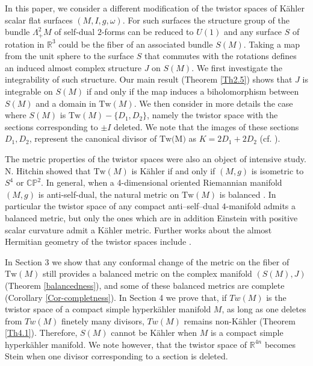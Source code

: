 \documentclass[11pt]{amsart}
\theoremstyle{definition}
\theoremstyle{plain}
\theoremstyle{definition}
\theoremstyle{plain}
\theoremstyle{remark}
\theoremstyle{plain}
\begin{document}
In this paper, we consider a different modification of the twistor spaces of K\"ahler scalar flat surfaces $(M, I, g, \omega)$. For such surfaces the structure group of the bundle $\Lambda^2_+ M$ of self-dual $2$-forms  can be reduced to $U(1)$ and any surface $S$ of rotation in ${\mathbb R}^3$ could be the fiber of an associated bundle $S(M)$. Taking a map from the unit sphere to  the surface $S$ that  commutes with the rotations  defines an induced almost complex structure $J$ on $S(M)$. We first investigate the integrability of such structure. Our main result (Theorem \ref{Th2.5})  shows that  $J$   is integrable on $S(M)$ if and only if the map induces a biholomorphism between $S(M)$ and a domain in ${\mbox{Tw}}(M)$.  We  then consider in more details the case where $S(M)$ is ${\mbox{Tw}}(M)-\{D_1,D_2\}$, namely the twistor space with the sections corresponding to $\pm I$ deleted. We note that the images of these sections $D_1, D_2$,  represent  the canonical divisor of ${\mbox{Tw(M)}}$ as $K=2D_1+2D_2$ (cf. \cite{Hitchin, Pontecorvo}).

The metric properties of the twistor spaces were also an object of intensive study.  N. Hitchin \cite{Hitchin}  showed that ${\mbox{Tw}}(M)$ is K\"ahler if and only if $(M, g)$ is isometric to $S^4$ or ${\mathbb {CP}}^2$. In general, when  a 4-dimensional oriented Riemannian manifold $(M, g)$  is anti-self-dual, the natural metric on ${\mbox {Tw}}(M)$ is balanced \cite{Michelsohn, Gauduchon2, Oleg}.  In particular
the twistor space of any compact anti–self–dual $4$-manifold admits a balanced metric, but only the ones which are in addition Einstein with positive scalar
curvature admit a K\"ahler metric. Further works about the almost Hermitian geometry of the twistor spaces include  \cite{ADM, Deschamps2, Catino-Dameno-Mastrolia}.

 In  Section  3 we  show that any conformal change of the metric on the fiber of ${\mbox{Tw}}(M)$ still provides a balanced metric  on the complex manifold $(S(M), J)$ (Theorem \ref{balancedness}), and some of these balanced metrics  are complete (Corollary \ref{Cor-completness}).  In Section 4 we prove  that, if $Tw(M)$ is the twistor space of a  compact simple  hyperk\"ahler manifold $M$,   as long as one deletes from $Tw(M)$
finetely many divisors,  $Tw(M)$ remains non-K\"ahler (Theorem \ref{Th4.1}).  Therefore,  $S(M)$ cannot be    K\"ahler  when $M$ is a compact simple hyperk\"ahler manifold. We note however, that the twistor space of ${\mathbb R}^{4n}$ becomes Stein when one divisor corresponding to a section is deleted.
\end{document}
